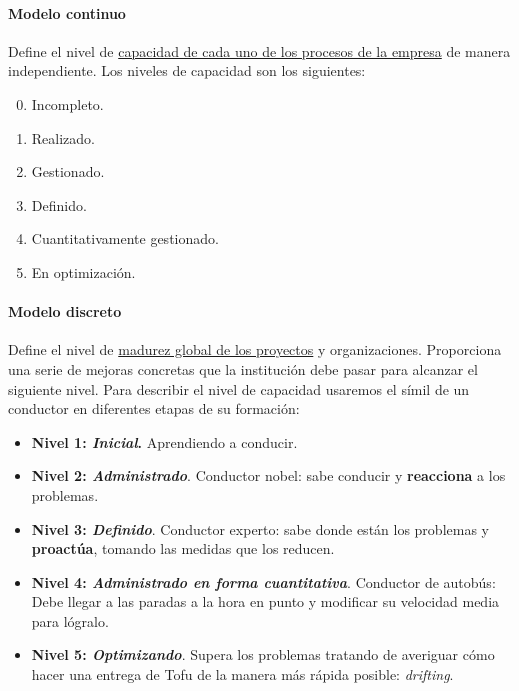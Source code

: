 \paragraph{Modelo continuo} Define el nivel de \uline{capacidad de cada uno de los procesos de la empresa} de manera independiente. Los niveles de capacidad son los siguientes:
\begin{enumerate}
    \setcounter{enumi}{-1}
    \item Incompleto.
    \item Realizado.
    \item Gestionado.
    \item Definido.
    \item Cuantitativamente gestionado.
    \item En optimización.
\end{enumerate}

\paragraph{Modelo discreto} Define el nivel de \uline{madurez global de los proyectos} y organizaciones. Proporciona una serie de mejoras concretas que la institución debe pasar para alcanzar el siguiente nivel.
Para describir el nivel de capacidad usaremos el símil de un conductor en diferentes etapas de su formación:
\begin{itemize}
    \item \textbf{Nivel 1: \textit{Inicial}.} Aprendiendo a conducir.
    \item \textbf{Nivel 2: \textit{Administrado}}. Conductor nobel: sabe conducir y \textbf{reacciona} a los problemas.
    \item \textbf{Nivel 3: \textit{Definido}}. Conductor experto: sabe donde están los problemas y \textbf{proactúa}, tomando las medidas que los reducen.
    \item \textbf{Nivel 4: \textit{Administrado en forma cuantitativa}}. Conductor de autobús: Debe llegar a las paradas a la hora en punto y modificar su velocidad media para lógralo.
    \item\textbf{ Nivel 5: \textit{Optimizando}}. Supera los problemas tratando de averiguar cómo hacer una entrega de Tofu de la manera más rápida posible: \textit{drifting}. %
\end{itemize}
